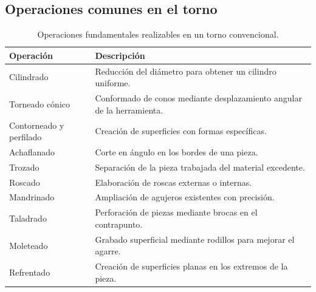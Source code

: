 \documentclass[12pt,a4paper]{article}
\begin{document}
\subsection{Operaciones comunes en el torno}
\label{subsec:operaciones_comunes}
\begin{table}[H]
    \centering
    \small
    \renewcommand{\arraystretch}{1.25}
    \begin{tabularx}{\textwidth}{l X}
        \toprule
        \textbf{Operación} & \textbf{Descripción} \\
        \midrule
        Cilindrado & Reducción del diámetro para obtener un cilindro uniforme. \\
        Torneado cónico & Conformado de conos mediante desplazamiento angular de la herramienta. \\
        Contorneado y perfilado & Creación de superficies con formas específicas. \\
        Achaflanado & Corte en ángulo en los bordes de una pieza. \\
        Trozado & Separación de la pieza trabajada del material excedente. \\
        Roscado & Elaboración de roscas externas o internas. \\
        Mandrinado & Ampliación de agujeros existentes con precisión. \\
        Taladrado & Perforación de piezas mediante brocas en el contrapunto. \\
        Moleteado & Grabado superficial mediante rodillos para mejorar el agarre. \\
        Refrentado & Creación de superficies planas en los extremos de la pieza. \\
        \bottomrule
    \end{tabularx}
    \caption{Operaciones fundamentales realizables en un torno convencional.}
    \label{tab:operaciones_torno}
\end{table}
\end{document}
